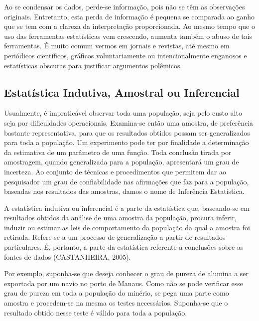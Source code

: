 
 Ao se condensar os dados, perde-se informação, pois não se têm as observações originais. Entretanto, esta perda de informação é pequena se comparada ao ganho que se tem com a clareza da interpretação proporcionada. Ao mesmo tempo que o uso das ferramentas estatísticas vem crescendo, aumenta também o abuso de tais ferramentas. É muito comum vermos em jornais e revistas, até mesmo em periódicos científicos, gráficos voluntariamente ou intencionalmente enganosos e estatísticas obscuras para justificar argumentos polêmicos.





\subsection{Estatística Indutiva, Amostral ou Inferencial}

\inic Usualmente, é impraticável observar toda uma população, seja pelo custo alto seja por dificuldades operacionais. Examina-se então uma amostra, de preferência bastante representativa, para que os resultados obtidos possam ser generalizados para toda a população. Um experimento pode ter por finalidade a determinação da estimativa de um parâmetro de uma função. Toda conclusão tirada por amostragem, quando generalizada para a população, apresentará um grau de incerteza. Ao conjunto de técnicas e procedimentos que permitem dar ao pesquisador um grau de confiabilidade nas afirmações que faz para a população, baseadas nos resultados das amostras, damos o nome de Inferência Estatística.\vskip0.3cm

A estatística indutiva ou inferencial é a parte da estatística que, baseando-se em resultados obtidos da análise de uma amostra da população, procura inferir, induzir ou estimar as leis de comportamento da população da qual a amostra foi retirada. Refere-se a um processo de generalização a partir de resultados particulares. É, portanto, a parte da estatística referente a conclusões sobre as fontes de dados (CASTANHEIRA, 2005).\vskip0.3cm


Por exemplo, suponha-se que deseja conhecer o grau de pureza de alumina a ser exportada por um navio no porto de Manaus. Como não se pode verificar esse grau de pureza em toda a população do minério, se pega uma parte como amostra e procedem-se na mesma os testes necessários. Suponha-se que o resultado obtido nesse teste é válido para toda a população.\vskip0.3cm

